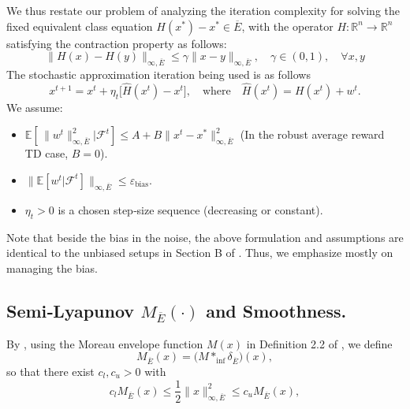 We thus restate our problem of analyzing the iteration complexity for solving the fixed equivalent class equation $H(x^*) - x^* \in \overline{E}$, with the operator \(H:\mathbb{R}^n \to \mathbb{R}^n\) satisfying the contraction property as follows:
\begin{equation}
  \|H(x) - H(y)\|_{\infty,\overline{E}} \leq \gamma\|x - y\|_{\infty,\overline{E}},
  \quad
  \gamma\in(0,1),
  \quad
  \forall x, y
\end{equation}
The stochastic approximation iteration being used is as follows
\begin{equation}\label{eq:SA-updategeneral}
   x^{t+1}= x^t + \eta_t \bigl[\widehat{H}(x^t) - x^t\bigr],
   \quad
   \text{where}\quad
   \widehat{H}(x^t)=  H(x^t) + w^t.
\end{equation}
We assume:
\begin{itemize}
\item \(\mathbb{E}[\,\|w^t\|_{\infty,\overline{E}}^2 | \mathcal{F}^t] \le A + B\|x^t - x^*\|_{\infty,\overline{E}}^2\) (In the robust average reward TD case, $B=0$).
\item \(\bigl\|\mathbb{E}[w^t | \mathcal{F}^t]\bigr\|_{\infty,\overline{E}} \le \varepsilon_{\mathrm{bias}}\).   
\item \(\eta_t>0\) is a chosen step‐size sequence (decreasing or constant).
\end{itemize}

Note that beside the bias in the noise, the above formulation and assumptions are identical to the unbiased setups in Section B of \citep{zhang2021finite}. Thus, we emphasize mostly on managing the bias.


\subsection{Semi‐Lyapunov \texorpdfstring{$M_{\overline{E}}(\cdot)$} M and Smoothness.}

By \citep[Proposition\,1--2]{zhang2021finite}, using the Moreau envelope function $M(x)$ in Definition 2.2 of \citep{chen2020finite}, we define
\[
  M_{\overline{E}}(x)=\bigl(M \ast_{\inf} \delta_{\overline{E}}\bigr)(x),
\]
so that there exist \(c_l,c_u>0\) with
\begin{equation} \label{eq:M2span}
  c_l   M_{\overline{E}}(x) \leq  \frac{1}{2}\|x\|_{\infty,\overline{E}}^2 \leq  c_u  M_{\overline{E}}(x),
\end{equation}

